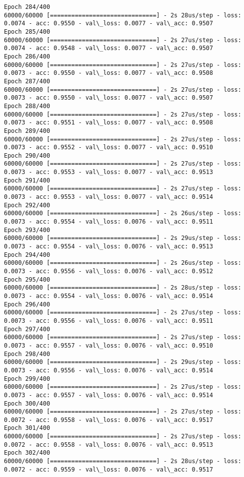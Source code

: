 \documentclass[11pt]{article}
\begin{document}
\begin{Verbatim}[commandchars=\\\{\}]
Epoch 284/400
60000/60000 [==============================] - 2s 28us/step - loss: 0.0074 - acc: 0.9550 - val\_loss: 0.0077 - val\_acc: 0.9507
Epoch 285/400
60000/60000 [==============================] - 2s 27us/step - loss: 0.0074 - acc: 0.9548 - val\_loss: 0.0077 - val\_acc: 0.9507
Epoch 286/400
60000/60000 [==============================] - 2s 27us/step - loss: 0.0073 - acc: 0.9550 - val\_loss: 0.0077 - val\_acc: 0.9508
Epoch 287/400
60000/60000 [==============================] - 2s 27us/step - loss: 0.0073 - acc: 0.9550 - val\_loss: 0.0077 - val\_acc: 0.9507
Epoch 288/400
60000/60000 [==============================] - 2s 27us/step - loss: 0.0073 - acc: 0.9551 - val\_loss: 0.0077 - val\_acc: 0.9508
Epoch 289/400
60000/60000 [==============================] - 2s 27us/step - loss: 0.0073 - acc: 0.9552 - val\_loss: 0.0077 - val\_acc: 0.9510
Epoch 290/400
60000/60000 [==============================] - 2s 27us/step - loss: 0.0073 - acc: 0.9553 - val\_loss: 0.0077 - val\_acc: 0.9513
Epoch 291/400
60000/60000 [==============================] - 2s 27us/step - loss: 0.0073 - acc: 0.9553 - val\_loss: 0.0077 - val\_acc: 0.9514
Epoch 292/400
60000/60000 [==============================] - 2s 26us/step - loss: 0.0073 - acc: 0.9554 - val\_loss: 0.0076 - val\_acc: 0.9511
Epoch 293/400
60000/60000 [==============================] - 2s 29us/step - loss: 0.0073 - acc: 0.9554 - val\_loss: 0.0076 - val\_acc: 0.9513
Epoch 294/400
60000/60000 [==============================] - 2s 26us/step - loss: 0.0073 - acc: 0.9556 - val\_loss: 0.0076 - val\_acc: 0.9512
Epoch 295/400
60000/60000 [==============================] - 2s 28us/step - loss: 0.0073 - acc: 0.9554 - val\_loss: 0.0076 - val\_acc: 0.9514
Epoch 296/400
60000/60000 [==============================] - 2s 27us/step - loss: 0.0073 - acc: 0.9556 - val\_loss: 0.0076 - val\_acc: 0.9511
Epoch 297/400
60000/60000 [==============================] - 2s 27us/step - loss: 0.0073 - acc: 0.9557 - val\_loss: 0.0076 - val\_acc: 0.9510
Epoch 298/400
60000/60000 [==============================] - 2s 29us/step - loss: 0.0073 - acc: 0.9556 - val\_loss: 0.0076 - val\_acc: 0.9514
Epoch 299/400
60000/60000 [==============================] - 2s 27us/step - loss: 0.0073 - acc: 0.9557 - val\_loss: 0.0076 - val\_acc: 0.9514
Epoch 300/400
60000/60000 [==============================] - 2s 27us/step - loss: 0.0072 - acc: 0.9558 - val\_loss: 0.0076 - val\_acc: 0.9517
Epoch 301/400
60000/60000 [==============================] - 2s 27us/step - loss: 0.0072 - acc: 0.9558 - val\_loss: 0.0076 - val\_acc: 0.9513
Epoch 302/400
60000/60000 [==============================] - 2s 28us/step - loss: 0.0072 - acc: 0.9559 - val\_loss: 0.0076 - val\_acc: 0.9517

\end{Verbatim}
\end{document}

